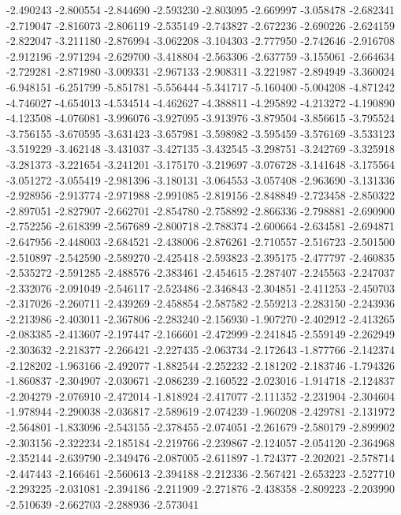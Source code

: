 -2.490243
-2.800554
-2.844690
-2.593230
-2.803095
-2.669997
-3.058478
-2.682341
-2.719047
-2.816073
-2.806119
-2.535149
-2.743827
-2.672236
-2.690226
-2.624159
-2.822047
-3.211180
-2.876994
-3.062208
-3.104303
-2.777950
-2.742646
-2.916708
-2.912196
-2.971294
-2.629700
-3.418804
-2.563306
-2.637759
-3.155061
-2.664634
-2.729281
-2.871980
-3.009331
-2.967133
-2.908311
-3.221987
-2.894949
-3.360024
-6.948151
-6.251799
-5.851781
-5.556444
-5.341717
-5.160400
-5.004208
-4.871242
-4.746027
-4.654013
-4.534514
-4.462627
-4.388811
-4.295892
-4.213272
-4.190890
-4.123508
-4.076081
-3.996076
-3.927095
-3.913976
-3.879504
-3.856615
-3.795524
-3.756155
-3.670595
-3.631423
-3.657981
-3.598982
-3.595459
-3.576169
-3.533123
-3.519229
-3.462148
-3.431037
-3.427135
-3.432545
-3.298751
-3.242769
-3.325918
-3.281373
-3.221654
-3.241201
-3.175170
-3.219697
-3.076728
-3.141648
-3.175564
-3.051272
-3.055419
-2.981396
-3.180131
-3.064553
-3.057408
-2.963690
-3.131336
-2.928956
-2.913774
-2.971988
-2.991085
-2.819156
-2.848849
-2.723458
-2.850322
-2.897051
-2.827907
-2.662701
-2.854780
-2.758892
-2.866336
-2.798881
-2.690900
-2.752256
-2.618399
-2.567689
-2.800718
-2.788374
-2.600664
-2.634581
-2.694871
-2.647956
-2.448003
-2.684521
-2.438006
-2.876261
-2.710557
-2.516723
-2.501500
-2.510897
-2.542590
-2.589270
-2.425418
-2.593823
-2.395175
-2.477797
-2.460835
-2.535272
-2.591285
-2.488576
-2.383461
-2.454615
-2.287407
-2.245563
-2.247037
-2.332076
-2.091049
-2.546117
-2.523486
-2.346843
-2.304851
-2.411253
-2.450703
-2.317026
-2.260711
-2.439269
-2.458854
-2.587582
-2.559213
-2.283150
-2.243936
-2.213986
-2.403011
-2.367806
-2.283240
-2.156930
-1.907270
-2.402912
-2.413265
-2.083385
-2.413607
-2.197447
-2.166601
-2.472999
-2.241845
-2.559149
-2.262949
-2.303632
-2.218377
-2.266421
-2.227435
-2.063734
-2.172643
-1.877766
-2.142374
-2.128202
-1.963166
-2.492077
-1.882544
-2.252232
-2.181202
-2.183746
-1.794326
-1.860837
-2.304907
-2.030671
-2.086239
-2.160522
-2.023016
-1.914718
-2.124837
-2.204279
-2.076910
-2.472014
-1.818924
-2.417077
-2.111352
-2.231904
-2.304604
-1.978944
-2.290038
-2.036817
-2.589619
-2.074239
-1.960208
-2.429781
-2.131972
-2.564801
-1.833096
-2.543155
-2.378455
-2.074051
-2.261679
-2.580179
-2.899902
-2.303156
-2.322234
-2.185184
-2.219766
-2.239867
-2.124057
-2.054120
-2.364968
-2.352144
-2.639790
-2.349476
-2.087005
-2.611897
-1.724377
-2.202021
-2.578714
-2.447443
-2.166461
-2.560613
-2.394188
-2.212336
-2.567421
-2.653223
-2.527710
-2.293225
-2.031081
-2.394186
-2.211909
-2.271876
-2.438358
-2.809223
-2.203990
-2.510639
-2.662703
-2.288936
-2.573041
